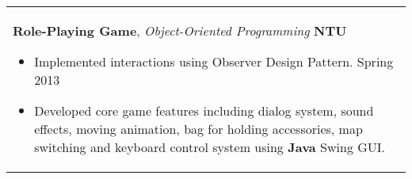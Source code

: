 \documentclass[a4paper,11pt]{article} %
\begin{document}
{\begin{tabular}{p{18.5cm}}
%
%
{\bf{Role-Playing Game}}, {\it{Object-Oriented Programming}} \hfill {\bf{NTU}}
\begin{itemize}
\item Implemented interactions using Observer Design Pattern.  \hfill Spring 2013
\item Developed core game features including dialog system, sound effects, moving animation, bag for holding accessories, map switching and keyboard control system using {\bf Java} Swing GUI.\vspace*{-\baselineskip}
\end{itemize}\\
%
\end{tabular}

}
\end{document}
